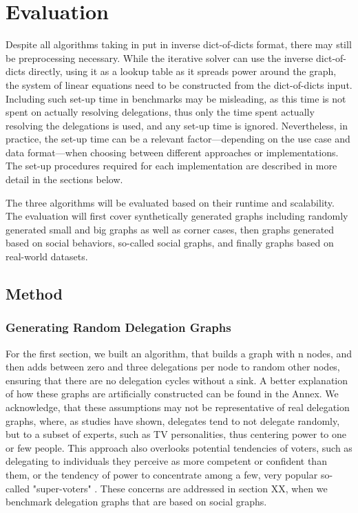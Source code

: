 \graphicspath{ {./figures/} }

\chapter{Evaluation}


Despite all algorithms taking in put in inverse dict-of-dicts format, there may still be preprocessing necessary. While the iterative solver can use the inverse dict-of-dicts directly, using it as a lookup table as it spreads power around the graph, the system of linear equations need to be constructed from the dict-of-dicts input. Including such set-up time in benchmarks may be misleading, as this time is not spent on actually resolving delegations, thus only the time spent actually resolving the delegations is used, and any set-up time is ignored. Nevertheless, in practice, the set-up time can be a relevant factor—depending on the use case and data format—when choosing between different approaches or implementations. The set-up procedures required for each implementation are described in more detail in the sections below.


The three algorithms will be evaluated based on their runtime and scalability. The evaluation will first cover synthetically generated graphs including randomly generated small and big graphs as well as corner cases, then graphs generated based on social behaviors, so-called social graphs, and finally graphs based on real-world datasets.

\section{Method}

\subsection{Generating Random Delegation Graphs}

For the first section, we built an algorithm, that builds a graph with n nodes, and then adds between zero and three delegations per node to random other nodes, ensuring that there are no delegation cycles without a sink. A better explanation of how these graphs are artificially constructed can be found in the Annex.  We acknowledge, that these assumptions may not be representative of real delegation graphs, where, as studies have shown, delegates tend to not delegate randomly, but to a subset of experts, such as TV personalities, thus centering power to one or few people. This approach also overlooks potential tendencies of voters, such as delegating to individuals they perceive as more competent or confident than them, or the tendency of power to concentrate among a few, very popular so-called "super-voters" \cite{klingVotingBehaviourPower2015}. These concerns are addressed in section XX, when we benchmark delegation graphs that are based on social graphs. 


